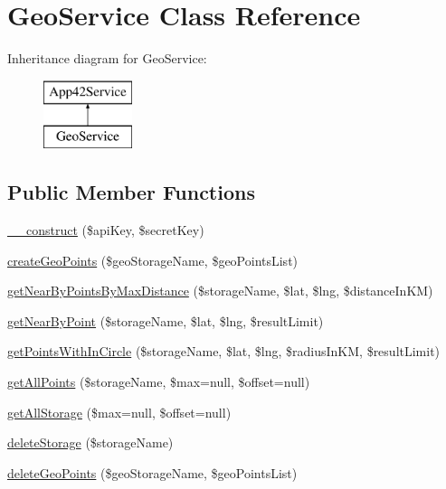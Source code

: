 \hypertarget{class_geo_service}{\section{Geo\+Service Class Reference}
\label{class_geo_service}
}
Inheritance diagram for Geo\+Service\+:\begin{figure}[H]
\begin{center}
\leavevmode
\includegraphics[height=2.000000cm]{class_geo_service}
\end{center}
\end{figure}
\subsection*{Public Member Functions}
\begin{DoxyCompactItemize}
\item 
\hyperlink{class_geo_service_a49f2ad222e06420736d750e167d55d7c}{\+\_\+\+\_\+construct} (\$api\+Key, \$secret\+Key)
\item 
\hyperlink{class_geo_service_a9af23846735b82cf60e3883975118cba}{create\+Geo\+Points} (\$geo\+Storage\+Name, \$geo\+Points\+List)
\item 
\hyperlink{class_geo_service_ab26ad53f002b9b96389994fd264b4adf}{get\+Near\+By\+Points\+By\+Max\+Distance} (\$storage\+Name, \$lat, \$lng, \$distance\+In\+K\+M)
\item 
\hyperlink{class_geo_service_a8c81e6d22081e2625dc6ac95748ce0df}{get\+Near\+By\+Point} (\$storage\+Name, \$lat, \$lng, \$result\+Limit)
\item 
\hyperlink{class_geo_service_aa222ca80559d182d864ac1b1f19428c5}{get\+Points\+With\+In\+Circle} (\$storage\+Name, \$lat, \$lng, \$radius\+In\+K\+M, \$result\+Limit)
\item 
\hyperlink{class_geo_service_aa5e4b70e464872aa3788a4c5b6d0b46e}{get\+All\+Points} (\$storage\+Name, \$max=null, \$offset=null)
\item 
\hyperlink{class_geo_service_a19a3967d8b6ec63b968f4a9b2af5e62c}{get\+All\+Storage} (\$max=null, \$offset=null)
\item 
\hyperlink{class_geo_service_a1fdf486ca1ba0834e3921ad6009a2768}{delete\+Storage} (\$storage\+Name)
\item 
\hyperlink{class_geo_service_a601a797b85ae174aaea5acf494c32640}{delete\+Geo\+Points} (\$geo\+Storage\+Name, \$geo\+Points\+List)
\end{DoxyCompactItemize}
